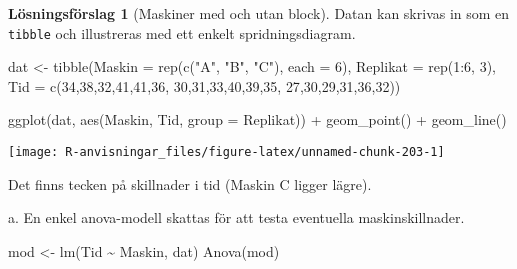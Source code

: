 \documentclass[
]{book}
\newenvironment{Shaded}{\begin{snugshade}}{\end{snugshade}}
\newcommand{\AttributeTok}[1]{\textcolor[rgb]{0.77,0.63,0.00}{#1}}
\newcommand{\DecValTok}[1]{\textcolor[rgb]{0.00,0.00,0.81}{#1}}
\newcommand{\FunctionTok}[1]{\textcolor[rgb]{0.00,0.00,0.00}{#1}}
\newcommand{\NormalTok}[1]{#1}
\newcommand{\OtherTok}[1]{\textcolor[rgb]{0.56,0.35,0.01}{#1}}
\newcommand{\SpecialCharTok}[1]{\textcolor[rgb]{0.00,0.00,0.00}{#1}}
\newcommand{\StringTok}[1]{\textcolor[rgb]{0.31,0.60,0.02}{#1}}
\theoremstyle{definition}
\theoremstyle{definition}
\theoremstyle{definition}
\theoremstyle{definition}
\newtheorem{hypothesis}{Lösningsförslag}[chapter]
\theoremstyle{remark}
\begin{document}
\begin{hypothesis}[Maskiner med och utan block]
Datan kan skrivas in som en \texttt{tibble} och illustreras med ett enkelt spridningsdiagram.

\begin{Shaded}
\begin{Highlighting}[]
\NormalTok{dat }\OtherTok{\textless{}{-}} \FunctionTok{tibble}\NormalTok{(}\AttributeTok{Maskin =} \FunctionTok{rep}\NormalTok{(}\FunctionTok{c}\NormalTok{(}\StringTok{"A"}\NormalTok{, }\StringTok{"B"}\NormalTok{, }\StringTok{"C"}\NormalTok{), }\AttributeTok{each =} \DecValTok{6}\NormalTok{),}
              \AttributeTok{Replikat =} \FunctionTok{rep}\NormalTok{(}\DecValTok{1}\SpecialCharTok{:}\DecValTok{6}\NormalTok{, }\DecValTok{3}\NormalTok{),}
              \AttributeTok{Tid =} \FunctionTok{c}\NormalTok{(}\DecValTok{34}\NormalTok{,}\DecValTok{38}\NormalTok{,}\DecValTok{32}\NormalTok{,}\DecValTok{41}\NormalTok{,}\DecValTok{41}\NormalTok{,}\DecValTok{36}\NormalTok{,}
                      \DecValTok{30}\NormalTok{,}\DecValTok{31}\NormalTok{,}\DecValTok{33}\NormalTok{,}\DecValTok{40}\NormalTok{,}\DecValTok{39}\NormalTok{,}\DecValTok{35}\NormalTok{,}
                      \DecValTok{27}\NormalTok{,}\DecValTok{30}\NormalTok{,}\DecValTok{29}\NormalTok{,}\DecValTok{31}\NormalTok{,}\DecValTok{36}\NormalTok{,}\DecValTok{32}\NormalTok{))}

\FunctionTok{ggplot}\NormalTok{(dat, }\FunctionTok{aes}\NormalTok{(Maskin, Tid, }\AttributeTok{group =}\NormalTok{ Replikat)) }\SpecialCharTok{+}
  \FunctionTok{geom\_point}\NormalTok{() }\SpecialCharTok{+}
  \FunctionTok{geom\_line}\NormalTok{()}
\end{Highlighting}
\end{Shaded}

\begin{center}\texttt{[image: R-anvisningar\_files/figure-latex/unnamed-chunk-203-1]} \end{center}

Det finns tecken på skillnader i tid (Maskin C ligger lägre).

a. En enkel anova-modell skattas för att testa eventuella maskinskillnader.

\begin{Shaded}
\begin{Highlighting}[]
\NormalTok{mod }\OtherTok{\textless{}{-}} \FunctionTok{lm}\NormalTok{(Tid }\SpecialCharTok{\textasciitilde{}}\NormalTok{ Maskin, dat)}
\FunctionTok{Anova}\NormalTok{(mod)}
\end{Highlighting}
\end{Shaded}


\end{hypothesis}
\end{document}
